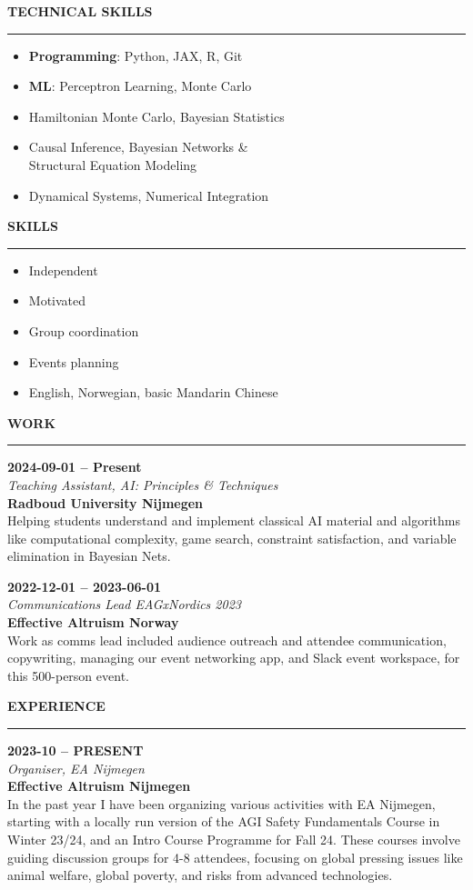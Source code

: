 \documentclass[11pt,a4paper]{article}
\newcommand{\cvsection}[1]{
    \vspace{1.0em}  %
    \par\textbf{\large #1}\smallskip\hrule
    \vspace{0.3em}  %
}
\newcommand{\entry}[4]{
    \par\textbf{#1} \hfill #2\\
    \textit{#3}\\
    #4\medskip
}
\begin{document}
\begin{multicols}{2}
\columnbreak

\cvsection{TECHNICAL SKILLS}
\begin{itemize}[leftmargin=*,nosep]
  \item \textbf{Programming}: Python, JAX, R, Git
  \item \textbf{ML}: Perceptron Learning, Monte Carlo
  \item Hamiltonian Monte Carlo, Bayesian Statistics
  \item Causal Inference, Bayesian Networks \& \\Structural Equation Modeling
  \item Dynamical Systems, Numerical Integration
\end{itemize}

\cvsection{SKILLS}
\begin{multicols}{2}
\begin{itemize}[leftmargin=*,nosep]
    \item Independent
    \item Motivated
    \item Group coordination
    \item Events planning
    \item English, Norwegian, basic Mandarin Chinese
\end{itemize}
\end{multicols}


\cvsection{WORK}
\entry{2024-09-01 -- Present}{}{Teaching Assistant, AI: Principles \& Techniques}{
  \textbf{Radboud University Nijmegen}\\
  Helping students understand and implement classical AI material and algorithms like computational complexity, game search, constraint satisfaction, and variable elimination in Bayesian Nets.
}

\entry{2022-12-01 -- 2023-06-01}{}{Communications Lead EAGxNordics 2023}{
    \textbf{Effective Altruism Norway}\\
    Work as comms lead included audience outreach and attendee communication, copywriting, managing our event networking app, and Slack event workspace, for this 500-person event.
}

\cvsection{EXPERIENCE}
\entry{2023-10 -- PRESENT}{}{Organiser, EA Nijmegen}{
  \textbf{Effective Altruism Nijmegen}\\
  In the past year I have been organizing various activities with EA Nijmegen, starting with a locally run version of the AGI Safety Fundamentals Course in Winter 23/24, and an Intro Course Programme for Fall 24. These courses involve guiding discussion groups for 4-8 attendees, focusing on global pressing issues like animal welfare, global poverty, and risks from advanced technologies. 
}
\end{multicols}
\end{document}
